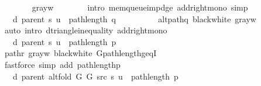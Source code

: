 \begin{isabellebody}
\ \ \ \ \ \ \isamarkupfalse%
\ gray{\isacharunderscore}{\kern0pt}w\isanewline
\ \ \ \ \ \ \isamarkupfalse%
\ {\isacharparenleft}{\kern0pt}intro\ mem{\isacharunderscore}{\kern0pt}queue{\isacharunderscore}{\kern0pt}imp{\isacharunderscore}{\kern0pt}d{\isacharunderscore}{\kern0pt}ge\ add{\isacharunderscore}{\kern0pt}right{\isacharunderscore}{\kern0pt}mono{\isacharparenright}{\kern0pt}\ simp\isanewline
\ \ \ \ \isamarkupfalse%
\ \isamarkupfalse%
\ {\isachardoublequoteopen}{\isachardot}{\kern0pt}{\isachardot}{\kern0pt}{\isachardot}{\kern0pt}\ {\isasymle}\ d\ {\isacharparenleft}{\kern0pt}parent\ s{\isacharparenright}{\kern0pt}\ u\ {\isacharplus}{\kern0pt}\ path{\isacharunderscore}{\kern0pt}length\ q\ {\isacharplus}{\kern0pt}\ {}{\isachardoublequoteclose}\isanewline
\ \ \ \ \ \ \isamarkupfalse%
\ alt{\isacharunderscore}{\kern0pt}path{\isacharunderscore}{\kern0pt}q\ black{\isacharunderscore}{\kern0pt}white\ gray{\isacharunderscore}{\kern0pt}w\isanewline
\ \ \ \ \ \ \isamarkupfalse%
\ {\isacharparenleft}{\kern0pt}auto\ intro{\isacharcolon}{\kern0pt}\ d{\isacharunderscore}{\kern0pt}triangle{\isacharunderscore}{\kern0pt}inequality\ add{\isacharunderscore}{\kern0pt}right{\isacharunderscore}{\kern0pt}mono{\isacharparenright}{\kern0pt}\isanewline
\ \ \ \ \isamarkupfalse%
\ \isamarkupfalse%
\ {\isachardoublequoteopen}{\isachardot}{\kern0pt}{\isachardot}{\kern0pt}{\isachardot}{\kern0pt}\ {\isasymle}\ d\ {\isacharparenleft}{\kern0pt}parent\ s{\isacharparenright}{\kern0pt}\ u\ {\isacharplus}{\kern0pt}\ path{\isacharunderscore}{\kern0pt}length\ p{\isachardoublequoteclose}\isanewline
\ \ \ \ \ \ \isamarkupfalse%
\ path{\isacharunderscore}{\kern0pt}r\ gray{\isacharunderscore}{\kern0pt}w\ black{\isacharunderscore}{\kern0pt}white\ G{\isachardot}{\kern0pt}path{\isacharunderscore}{\kern0pt}length{\isacharunderscore}{\kern0pt}geq{\isacharunderscore}{\kern0pt}{}I\isanewline
\ \ \ \ \ \ \isamarkupfalse%
\ {\isacharparenleft}{\kern0pt}fastforce\ simp\ add{\isacharcolon}{\kern0pt}\ path{\isacharunderscore}{\kern0pt}length{\isacharunderscore}{\kern0pt}p{\isacharparenright}{\kern0pt}\isanewline
\ \ \ \ \isamarkupfalse%
\ \isamarkupfalse%
\ {\isachardoublequoteopen}{\isachardot}{\kern0pt}{\isachardot}{\kern0pt}{\isachardot}{\kern0pt}\ {\isacharequal}{\kern0pt}\ d\ {\isacharparenleft}{\kern0pt}parent\ {\isacharparenleft}{\kern0pt}alt{\isacharunderscore}{\kern0pt}fold\ G{}\ G{}\ src\ s{\isacharparenright}{\kern0pt}{\isacharparenright}{\kern0pt}\ u\ {\isacharplus}{\kern0pt}\ path{\isacharunderscore}{\kern0pt}length\ p{\isachardoublequoteclose}\isanewline

\end{isabellebody}
